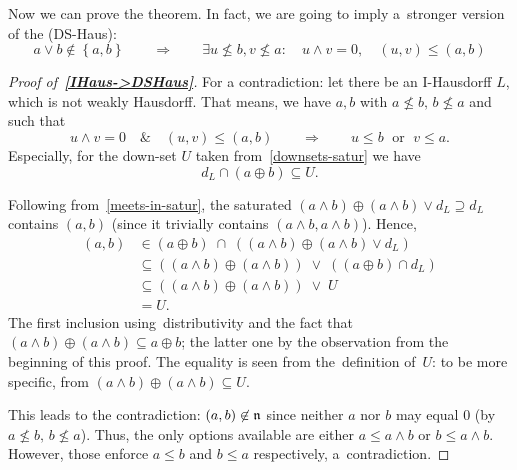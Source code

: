 Now we can prove the theorem.
In fact, we are going to imply a~stronger version of the (DS-Haus):
\[
  a \vee b \not\in \left\{a, b\right\} \qquad \Rightarrow \qquad \exists
  u\not\leq b, v\not\leq a: \quad u \wedge v = 0, \quad \boxed{\left(u,
  v\right) \leq \left(a, b\right)}
\]

\begin{proof}[Proof of~{\bf \ref{IHaus->DSHaus}}\thinspace]
  For a contradiction: let there be an I-Hausdorff $L$, which is not weakly
  Hausdorff.
  That means, we have $a, b$ with $a \not\leq b, \, b \not\leq a$ and such that
  \[
    u \wedge v = 0 \quad \& \quad \left(u, v\right) \leq \left(a, b\right)
    \qquad \Longrightarrow \qquad
    u \leq b \; \textrm{ or } \; v \leq a.
  \]
  Especially, for the down-set $U$ taken from~\ref{downsets-satur} we have
  \[
    d_L \cap (a \oplus b) \subseteq U.
  \]

  Following from~\ref{meets-in-satur}\thinspace, the saturated $\left(a \wedge
  b\right) \oplus \left(a \wedge b\right) \vee d_L \supseteq d_L$ contains $(a,
  b)$ (since it trivially contains $\left( a \wedge b, a \wedge b \right)$).
  Hence,
  \begin{align*}
    (a, b) &\in (a \oplus b) \; \cap \; ((a \wedge b) \oplus (a \wedge b) \vee d_L) \\
           &\subseteq ((a \wedge b) \oplus (a \wedge b)) \; \vee \; ((a \oplus b) \cap d_L) \\
           &\subseteq ((a \wedge b) \oplus (a \wedge b)) \; \vee \; U \\
           &= U.
  \end{align*}
  The first inclusion using~distributivity and the fact that $(a \wedge b)
  \oplus (a \wedge b) \subseteq a \oplus b$;
  the latter one by the observation from the beginning of this proof.
  The equality is seen from the~definition of~$U$:
  to be more specific, from $(a \wedge b) \oplus (a \wedge b) \subseteq U$.

  This leads to the contradiction:
  $(a, b)\not\in \mathfrak{n}$ since neither $a$ nor $b$ may equal $0$ (by $a \not\leq b,
  \, b \not\leq a$).
  Thus, the only options available are either $a \leq a \wedge b$ or $b \leq a
  \wedge b$.
  However, those enforce $a \leq b$ and $b \leq a$ respectively,
  a~contradiction. 
\end{proof}
